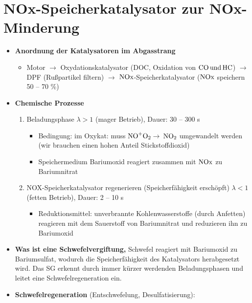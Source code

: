 \section{NOx-Speicherkatalysator zur
NOx-Minderung}\label{nox-speicherkatalysator-zur-nox-minderung}

\begin{itemize}
\item
  \textbf{Anordnung der Katalysatoren im Abgasstrang}

  \begin{itemize}
  \item
    Motor $\to$ Oxydationskatalysator (DOC, Oxidation von
    $\ce{CO und HC}$) $\to$ DPF (Rußpartikel filtern) $\to$
    $\ce{NOx}$-Speicherkatalysator ($\ce{NOx}$ speichern 50 -- 70
    \%)
  \end{itemize}
\item
  \textbf{Chemische Prozesse}

  \begin{enumerate}
  \item
    Beladungsphase $\lambda > 1$ (mager Betrieb), Dauer: 30 -- 300 s

    \begin{itemize}
    \item
      Bedingung: im Oxykat: muss $\ce{NO+O2} \to$ $\ce{NO2}$
      umgewandelt werden (wir brauchen einen hohen Anteil
      Stickstoffdioxid)
    \item
      Speichermedium Bariumoxid reagiert zusammen mit $\ce{NOx}$ zu
      Bariumnitrat
    \end{itemize}
  \item
    NOX-Speicherkatalysator regenerieren (Speicherfähigkeit erschöpft)
    $\lambda < 1$ (fetten Betrieb), Dauer: 2 -- 10 s

    \begin{itemize}
    \item
      Reduktionsmittel: unverbrannte Kohlenwasserstoffe (durch Anfetten)
      reagieren mit dem Sauerstoff von Bariumnitrat und reduzieren ihn
      zu Bariumoxid
    \end{itemize}
  \end{enumerate}
\item
  \textbf{Was ist eine Schwefelvergiftung,} Schwefel reagiert mit
  Bariumoxid zu Bariumsulfat, wodurch die Speicherfähigkeit des
  Katalysators herabgesetzt wird. Das SG erkennt durch immer kürzer
  werdenden Beladungsphasen und leitet eine Schwefelregeneration ein.
\item
  \textbf{Schwefelregeneration} (Entschwefelung, Desulfatisierung):


\end{itemize}
